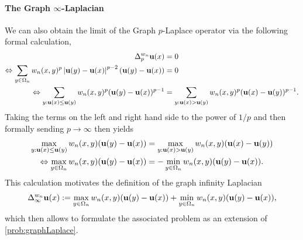 \paragraph{The Graph $\infty$-Laplacian}
%
We can also obtain the limit of the Graph $p$-Laplace operator via the following formal calculation,
%
\begin{align*}
\Delta^{w_n}_p \vec u(x) &= 0\\
\Leftrightarrow \sum_{y\in\domain_n} w_n(x,y)^{p} \abs{\vec u(y) - \vec u(x)}^{p-2} (\vec u(y) - \vec u(x)) &= 0\\
%
\Leftrightarrow 
\sum_{y: \vec u(x)\leq \vec u(y)} w_n(x,y)^{p}(\vec u(y)-\vec u(x))^{p-1}
&= \sum_{y: \vec u(x)> \vec u(y)} w_n(x,y)^{p}(\vec u(x)-\vec u(y))^{p-1}.
\end{align*}
%
Taking the terms on the left and right hand side to the power of $1/p$ and then formally sending $p\to\infty$ then yields
%
\begin{align*}
\max_{y: \vec u(x)\leq \vec u(y)} w_n(x,y)(\vec u(y)-\vec u(x)) &= 
\max_{y: \vec u(x) > \vec u(y)} w_n(x,y)(\vec u(x)-\vec u(y))\\
%
\Leftrightarrow \max_{y\in\domain_n} w_n(x,y)(\vec u(y)-\vec u(x)) &= 
-\min_{y\in\domain_n} w_n(x,y)(\vec u(y)-\vec u(x)).
\end{align*}
%
%
This calculation motivates the definition of the graph infinity Laplacian
%
\begin{align*}
\Delta_\infty^{w_n} \mathbf{u}(x) := \max_{y\in\Omega_n} w_n(x,y)(\mathbf{u}(y)-\mathbf{u}(x)) +
\min_{y\in\Omega_n} w_n(x,y)(\mathbf{u}(y)-\mathbf{u}(x)),
\end{align*}
%
which then allows to formulate the associated problem as an  extension of \cref{prob:graphLaplace}.

